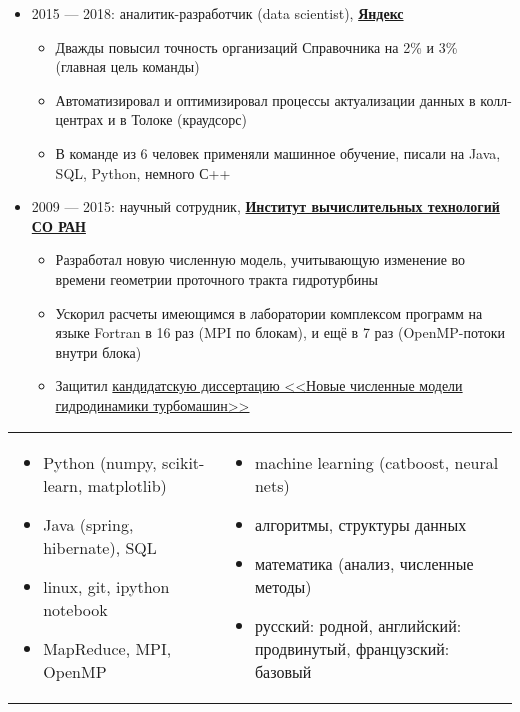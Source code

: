 \documentclass[11pt]{article}
\begin{document}
\begin{itemize}
\item 2015 — 2018: аналитик-разработчик (data scientist), \textbf{\href{https://yandex.ru/}{Яндекс}}
\begin{itemize}
	\item Дважды повысил точность организаций Справочника на 2\% и 3\% (главная цель команды)
	\item Автоматизировал и оптимизировал процессы актуализации данных в колл-центрах и в Толоке (краудсорс)
	\item В команде из 6 человек применяли машинное обучение, писали на Java, SQL, Python, немного С++
\end{itemize}

\item 2009 — 2015: научный сотрудник, \textbf{\href{http://www.ict.nsc.ru}{Институт вычислительных технологий СО РАН}}
\begin{itemize}
	\item Разработал новую численную модель, учитывающую изменение во времени геометрии проточного тракта гидротурбины
	\item Ускорил расчеты имеющимся в лаборатории комплексом программ на языке Fortran в 16 раз (MPI по блокам), и ещё в 7 раз (OpenMP-потоки внутри блока)
	\item Защитил \href{https://github.com/avalur/dissertation/blob/master/to_print/autoref_Avdyushenko.pdf}{кандидатскую диссертацию <<Новые численные модели гидродинамики турбомашин>>}
\end{itemize}
\end{itemize}

\begin{longtable} {p{}p{}}
\vspace{-2.0em}
\begin{itemize}
	\item Python (numpy, scikit-learn, matplotlib)
	\item Java (spring, hibernate), SQL
	\item linux, git, ipython notebook
	\item MapReduce, MPI, OpenMP
\end{itemize}
&
\vspace{-2.0em}
\begin{itemize}
	\item machine learning (catboost, neural nets)
	\item алгоритмы, структуры данных
	\item математика (анализ, численные методы)
	\item русский: родной, английский: продвинутый, французский: базовый
\end{itemize}
\\
\end{longtable}
\end{document}
